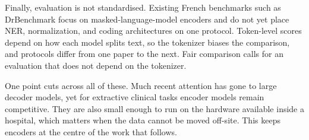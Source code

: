 Finally, evaluation is not standardised. Existing French benchmarks such as DrBenchmark focus on
masked-language-model encoders and do not yet place NER, normalization, and coding architectures
on one protocol. Token-level scores depend on how each model splits text, so the tokenizer biases
the comparison, and protocols differ from one paper to the next. Fair comparison calls for an evaluation that does not depend on the tokenizer.

One point cuts across all of these. Much recent attention has gone to large decoder
models, yet for extractive clinical tasks encoder models remain competitive. They are also
small enough to run on the hardware available inside a hospital, which matters when the data
cannot be moved off-site. This keeps encoders at the centre of the work that follows.
